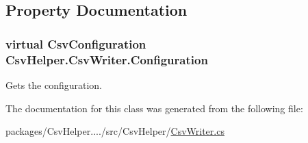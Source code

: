 \subsection{Property Documentation}
\hypertarget{a00061_a5124d88929643a9a9fc95f5a0630fce8}{
\subsubsection[{Configuration}]{\setlength{\rightskip}{0pt plus 5cm}virtual {\bf Csv\-Configuration} Csv\-Helper.\-Csv\-Writer.\-Configuration\hspace{0.3cm}{\ttfamily [get]}}}\label{a00061_a5124d88929643a9a9fc95f5a0630fce8}


Gets the configuration. 



The documentation for this class was generated from the following file\-:\begin{DoxyCompactItemize}
\item 
packages/\-Csv\-Helper..../src/\-Csv\-Helper/\hyperlink{a00206}{Csv\-Writer.\-cs}\end{DoxyCompactItemize}
